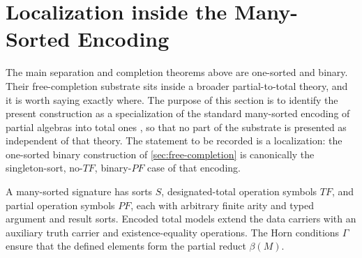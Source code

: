 \section{Localization inside the Many-Sorted Encoding}
\label{sec:diaconescu-bridge}

The main separation and completion theorems above are one-sorted and binary.
Their free-completion substrate sits inside a broader partial-to-total
theory, and it is worth saying exactly where.  The purpose of this section is
to identify the present construction as a specialization of the standard
many-sorted encoding of partial algebras into total ones
\cite{Diaconescu2009}, so that no part of the substrate is presented as
independent of that theory.  The statement to be recorded is a localization:
the one-sorted binary construction of \cref{sec:free-completion} is
canonically the singleton-sort, no-$TF$, binary-$PF$ case of that encoding.

A many-sorted signature has sorts $S$, designated-total operation symbols
$TF$, and partial operation symbols $PF$, each with arbitrary finite arity and
typed argument and result sorts.  Encoded total models extend the data carriers
with an auxiliary truth carrier and existence-equality operations.  The Horn
conditions $\Gamma$ ensure that the defined elements form the partial reduct
$\beta(M)$.

